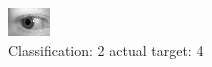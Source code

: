 \begin{figure}[h!]
\begin{center}
\includegraphics[width=0.60\columnwidth]{figures/ID811_class_2_target_4.png}
\end{center}
\caption{ Classification: 2 actual target: 4}
\label{fig:ID811_class_2_target_4}
\end{figure}

